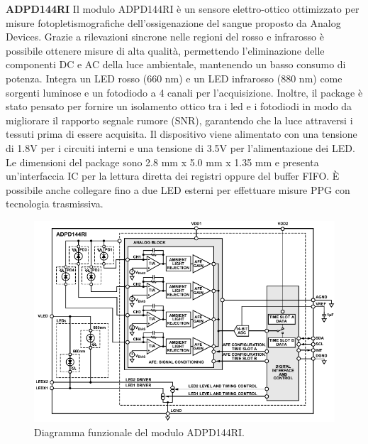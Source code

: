 \textbf{ADPD144RI} Il modulo ADPD144RI è un sensore elettro-ottico ottimizzato per misure fotopletismografiche dell'ossigenazione del sangue proposto da Analog Devices\cite{AnalogDevicesADPD144RI}. Grazie a rilevazioni sincrone nelle regioni del rosso e infrarosso è possibile ottenere misure di alta qualità, permettendo l'eliminazione delle componenti DC e AC della luce ambientale, mantenendo un basso consumo di potenza. Integra un LED rosso (660 nm) e un LED infrarosso (880 nm) come sorgenti luminose e un fotodiodo a 4 canali per l'acquisizione. Inoltre, il package è stato pensato per fornire un isolamento ottico tra i led e i fotodiodi in modo da migliorare il rapporto segnale rumore (SNR), garantendo che la luce attraversi i tessuti prima di essere acquisita. Il dispositivo viene alimentato con una tensione di 1.8V per i circuiti interni e una tensione di 3.5V per l'alimentazione dei LED. Le dimensioni del package sono 2.8 mm x 5.0 mm x 1.35 mm e presenta un'interfaccia IC per la lettura diretta dei registri oppure del buffer FIFO. \`E possibile anche collegare fino a due LED esterni per effettuare misure PPG con tecnologia trasmissiva.
\begin{figure}[b]
	\centering
	\includegraphics[width=0.8\linewidth]{ImageFiles/Fotopletismografia/ADPD144RIBlockDiagram}
	\caption{Diagramma funzionale del modulo ADPD144RI.}
	\label{fig:ADPD144RIBlockDiagram}
\end{figure}
\pagebreak

